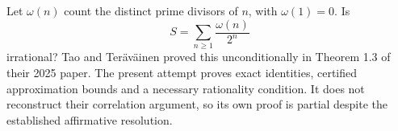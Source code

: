 Let $\omega(n)$ count the distinct prime divisors of $n$, with
$\omega(1)=0$. Is
\[
 S=\sum_{n\geq1}\frac{\omega(n)}{2^n}
\]
irrational? Tao and Ter\"av\"ainen proved this unconditionally in
Theorem 1.3 of their 2025 paper. The present attempt proves exact
identities, certified approximation bounds and a necessary rationality
condition. It does not reconstruct their correlation argument, so its
own proof is partial despite the established affirmative resolution.
